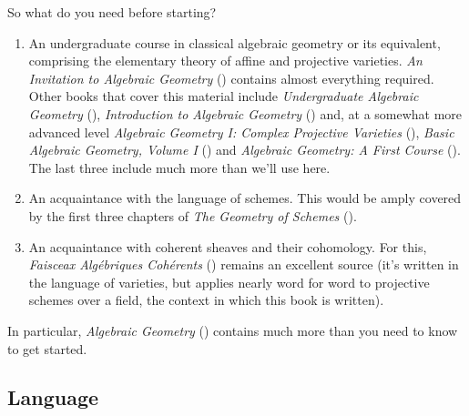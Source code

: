
So what do you need before starting? 

\begin{enumerate}

\item An undergraduate course in classical algebraic geometry or its equivalent, comprising the elementary theory of affine and projective varieties.  \emph{An Invitation to Algebraic Geometry} (\cite{MR1788561}) %
 contains almost everything required. Other books that cover this material include 
\emph{Undergraduate Algebraic Geometry} (\cite{MR982494}), %
\emph{Introduction to Algebraic Geometry} (\cite{MR2324354}) %
and, at a somewhat more advanced level 
 \emph{Algebraic Geometry I: Complex Projective Varieties}  (\cite{Mumford1976}), %
\emph{Basic Algebraic Geometry, Volume I} (\cite{Shafarevich1974}) and \emph{Algebraic Geometry: A First Course} (\cite{Harris1992}). The last three include much more than we'll use here.

\item An acquaintance with the language of schemes. This would be amply covered by the first three chapters of  \emph{The Geometry of Schemes}  (\cite{MR1730819}). %

\item An acquaintance with coherent sheaves and their cohomology. For this, \emph{Faisceax Alg\'ebriques Coh\'erents}  (\cite{Serre1955}) remains an excellent source (it's written in the language of varieties, but applies nearly word for word to projective schemes over a field, the context in which this book is written). 

\end{enumerate}

In particular, \emph{Algebraic Geometry} (\cite{Hartshorne1977}) contains much more than you need to know to get started.

\subsection{Language}
 

